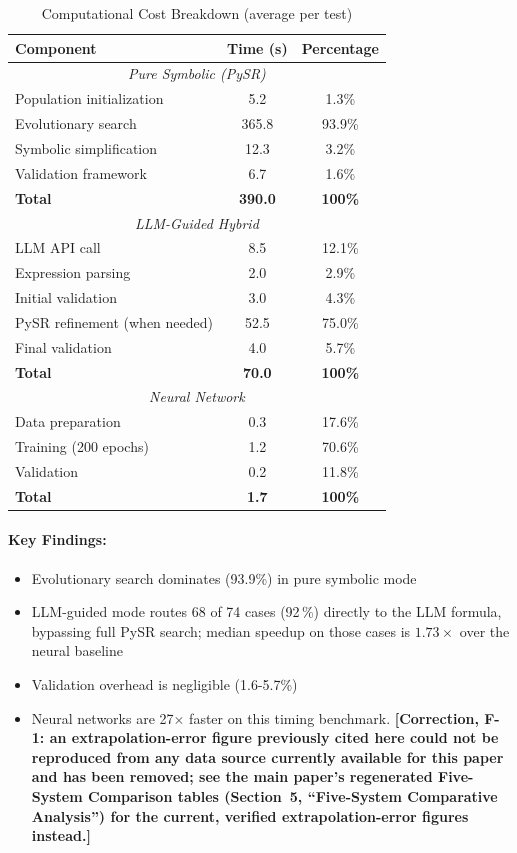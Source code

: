 \documentclass[twoside,11pt]{article}
\begin{document}
\begin{table}[H]
\centering
\caption{Computational Cost Breakdown (average per test)}
\label{tab:timing_breakdown}
\begin{tabular}{@{}lcc@{}}
\toprule
\textbf{Component} & \textbf{Time (s)} & \textbf{Percentage} \\
\midrule
\multicolumn{3}{c}{\textit{Pure Symbolic (PySR)}} \\
\midrule
Population initialization & 5.2 & 1.3\% \\
Evolutionary search & 365.8 & 93.9\% \\
Symbolic simplification & 12.3 & 3.2\% \\
Validation framework & 6.7 & 1.6\% \\
\midrule
\textbf{Total} & \textbf{390.0} & \textbf{100\%} \\
\midrule
\multicolumn{3}{c}{\textit{LLM-Guided Hybrid}} \\
\midrule
LLM API call & 8.5 & 12.1\% \\
Expression parsing & 2.0 & 2.9\% \\
Initial validation & 3.0 & 4.3\% \\
PySR refinement (when needed) & 52.5 & 75.0\% \\
Final validation & 4.0 & 5.7\% \\
\midrule
\textbf{Total} & \textbf{70.0} & \textbf{100\%} \\
\midrule
\multicolumn{3}{c}{\textit{Neural Network}} \\
\midrule
Data preparation & 0.3 & 17.6\% \\
Training (200 epochs) & 1.2 & 70.6\% \\
Validation & 0.2 & 11.8\% \\
\midrule
\textbf{Total} & \textbf{1.7} & \textbf{100\%} \\
\bottomrule
\end{tabular}
\end{table}

\paragraph{Key Findings:}
\begin{itemize}
\item Evolutionary search dominates (93.9\%) in pure symbolic mode
\item LLM-guided mode routes 68 of 74 cases (92\,\%) directly to the LLM formula, bypassing full PySR search; median speedup on those cases is $1.73\times$ over the neural baseline \citep{kambhampati2024llms}
\item Validation overhead is negligible (1.6-5.7\%)
\item Neural networks are 27$\times$ faster on this timing benchmark. \textbf{[Correction, F-1: an extrapolation-error figure previously cited here could not be reproduced from any data source currently available for this paper and has been removed; see the main paper's regenerated Five-System Comparison tables (Section~5, ``Five-System Comparative Analysis'') for the current, verified extrapolation-error figures instead.]}
\end{itemize}
\end{document}
